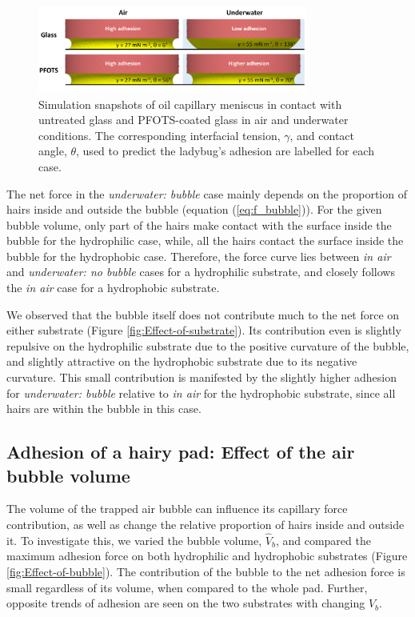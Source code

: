\documentclass[vruler,JEB]{COB}%
\begin{document}
\begin{figure}
\includegraphics[width=3.5in]{Figure-8-contact_angle_schematic}\caption{\label{fig:Oil-contact-images}Simulation snapshots of oil capillary
meniscus in contact with untreated glass and PFOTS-coated glass in air and underwater conditions.
The corresponding interfacial tension, $\gamma$, and contact
angle, $\theta$, used to predict the ladybug's adhesion
are labelled for each case.}
\end{figure}

The net force in the \emph{underwater: bubble} case mainly depends
on the proportion of hairs inside and outside the bubble (equation
(\ref{eq:f_bubble})). For the given bubble volume, only part of the
hairs make contact with the surface inside the bubble for the hydrophilic case, while,
all the hairs contact the surface inside the bubble for the hydrophobic case.
Therefore, the force curve lies between \emph{in air} and \emph{underwater:
no bubble} cases for a hydrophilic substrate, and closely follows
the \emph{in air} case for a hydrophobic substrate.

We observed that the bubble itself does not contribute much to the net force
on either substrate (Figure \ref{fig:Effect-of-substrate}). Its contribution
even is slightly repulsive on the hydrophilic substrate due to the
positive curvature of the bubble, and slightly attractive on the hydrophobic
substrate due to its negative curvature. This small contribution is
manifested by the slightly higher adhesion for \emph{underwater: bubble}
relative to \emph{in air} for the hydrophobic substrate, since all
hairs are within the bubble in this case.

\subsection{Adhesion of a hairy pad: Effect of the air bubble volume}

The volume of the trapped air bubble can influence its capillary force contribution,
as well as change the relative proportion of hairs inside and outside
it. To investigate this, we varied the bubble volume, $\hat{V}_{b}$,
and compared the maximum adhesion force on both hydrophilic and hydrophobic
substrates (Figure \ref{fig:Effect-of-bubble}). The contribution
of the bubble to the net adhesion force is small regardless of its
volume, when compared to the whole pad. Further, opposite trends of
adhesion are seen on the two substrates with changing $\hat{V}_{b}$.
\end{document}
